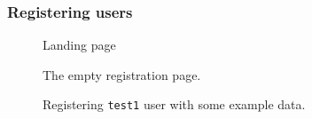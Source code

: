 \documentclass{article}
\begin{document}
		\subsubsection{Registering users}

		\begin{figure}[H]
			\centering
			\caption{Landing page}
			\label{fig:eval-prep-1}
		\end{figure}

		\begin{figure}[H]
			\centering
			\caption{The empty registration page.}
			\label{fig:eval-prep-2}
		\end{figure}

		\begin{figure}[H]
			\centering
			\caption{Registering \texttt{test1} user with some example data.}
			\label{fig:eval-prep-3}
		\end{figure}
\end{document}
